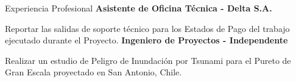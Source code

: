 \begin{rubric}{Experiencia Profesional}
\entry*[2015]%
	\textbf{Asistente de Oficina Técnica - Delta S.A.}
	\par Reportar las salidas de soporte técnico para los Estados de Pago del trabajo ejecutado durante el Proyecto.
%
%
\entry*[2013 - 2014]%
	\textbf{Ingeniero de Proyectos - Independente}
	\par Realizar un estudio de Peligro de Inundación por Tsunami para el Pureto de Gran Escala proyectado en San Antonio, Chile.
\end{rubric}

